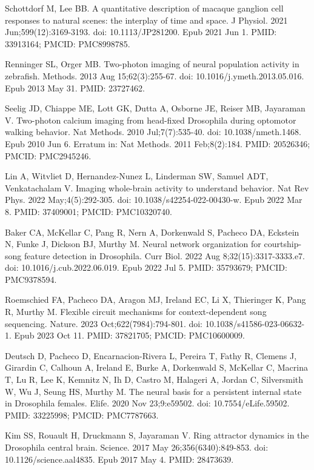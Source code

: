 \documentclass[10pt,letterpaper]{article}
\begin{document}
\begin{thebibliography}{10}
Schottdorf M, Lee BB. A quantitative description of macaque ganglion cell responses to natural scenes: the interplay of time and space. J Physiol. 2021 Jun;599(12):3169-3193. doi: 10.1113/JP281200. Epub 2021 Jun 1. PMID: 33913164; PMCID: PMC8998785.

Renninger SL, Orger MB. Two-photon imaging of neural population activity in zebrafish. Methods. 2013 Aug 15;62(3):255-67. doi: 10.1016/j.ymeth.2013.05.016. Epub 2013 May 31. PMID: 23727462.

Seelig JD, Chiappe ME, Lott GK, Dutta A, Osborne JE, Reiser MB, Jayaraman V. Two-photon calcium imaging from head-fixed Drosophila during optomotor walking behavior. Nat Methods. 2010 Jul;7(7):535-40. doi: 10.1038/nmeth.1468. Epub 2010 Jun 6. Erratum in: Nat Methods. 2011 Feb;8(2):184. PMID: 20526346; PMCID: PMC2945246.

Lin A, Witvliet D, Hernandez-Nunez L, Linderman SW, Samuel ADT, Venkatachalam V. Imaging whole-brain activity to understand behavior. Nat Rev Phys. 2022 May;4(5):292-305. doi: 10.1038/s42254-022-00430-w. Epub 2022 Mar 8. PMID: 37409001; PMCID: PMC10320740.

Baker CA, McKellar C, Pang R, Nern A, Dorkenwald S, Pacheco DA, Eckstein N, Funke J, Dickson BJ, Murthy M. Neural network organization for courtship-song feature detection in Drosophila. Curr Biol. 2022 Aug 8;32(15):3317-3333.e7. doi: 10.1016/j.cub.2022.06.019. Epub 2022 Jul 5. PMID: 35793679; PMCID: PMC9378594. 

Roemschied FA, Pacheco DA, Aragon MJ, Ireland EC, Li X, Thieringer K, Pang R, Murthy M. Flexible circuit mechanisms for context-dependent song sequencing. Nature. 2023 Oct;622(7984):794-801. doi: 10.1038/s41586-023-06632-1. Epub 2023 Oct 11. PMID: 37821705; PMCID: PMC10600009.

Deutsch D, Pacheco D, Encarnacion-Rivera L, Pereira T, Fathy R, Clemens J, Girardin C, Calhoun A, Ireland E, Burke A, Dorkenwald S, McKellar C, Macrina T, Lu R, Lee K, Kemnitz N, Ih D, Castro M, Halageri A, Jordan C, Silversmith W, Wu J, Seung HS, Murthy M. The neural basis for a persistent internal state in Drosophila females. Elife. 2020 Nov 23;9:e59502. doi: 10.7554/eLife.59502. PMID: 33225998; PMCID: PMC7787663.

Kim SS, Rouault H, Druckmann S, Jayaraman V. Ring attractor dynamics in the Drosophila central brain. Science. 2017 May 26;356(6340):849-853. doi: 10.1126/science.aal4835. Epub 2017 May 4. PMID: 28473639.


\end{thebibliography}
\end{document}

